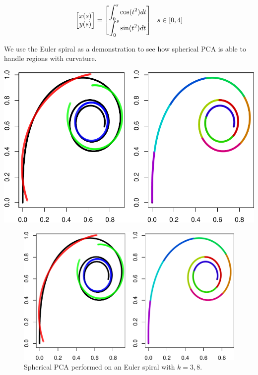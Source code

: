 \documentclass[]{article}
\begin{document}
\[
\begin{bmatrix}x(s) \\ y(s)\end{bmatrix} = 
\begin{bmatrix}
\displaystyle\int_0^s \cos(t^2) dt \\
\displaystyle\int_0^s \sin(t^2) dt
\end{bmatrix} \hspace{0.1in} s \in [0, 4]
\]

We use the Euler spiral as a demonstration to see how spherical PCA is
able to handle regions with curvature.

\begin{center}\includegraphics{Term_paper_files/figure-latex/Euler-1} \end{center}

\begin{figure}[H]

{\centering \includegraphics{Term_paper_files/figure-latex/euler-1} 

}

\caption{Spherical PCA performed on an Euler spiral with $k = 3, 8$.}\label{fig:euler}
\end{figure}
\end{document}
